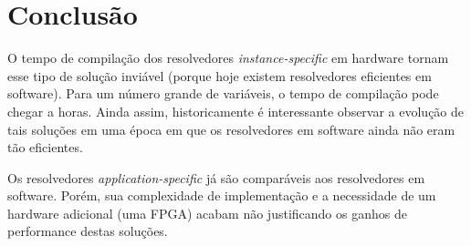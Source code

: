 \documentclass[12pt,a4paper]{article}
\begin{document}
\section{Conclusão}

O tempo de compilação dos resolvedores \textit{instance-specific} em hardware tornam esse tipo de solução inviável (porque hoje existem resolvedores eficientes em software). Para um número grande de variáveis, o tempo de compilação pode chegar a horas. Ainda assim, historicamente é interessante observar a evolução de tais soluções em uma época em que os resolvedores em software ainda não eram tão eficientes.

Os resolvedores \textit{application-specific} já são comparáveis aos resolvedores em software. Porém, sua complexidade de implementação e a necessidade de um hardware adicional (uma FPGA) acabam não justificando os ganhos de performance destas soluções.



\end{document}
